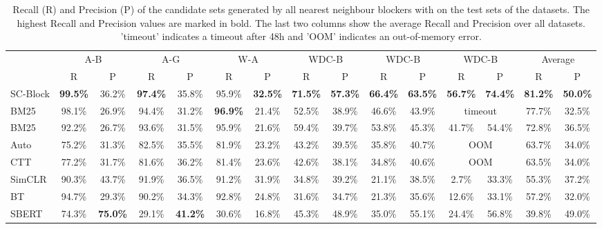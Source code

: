 \documentclass[sigconf,nonacm]{acmart}
\begin{document}
\begin{table*}[]
\caption{Recall (R) and Precision (P) of the candidate sets generated by all nearest neighbour blockers with  on the test sets of the datasets. The highest Recall and Precision values are marked in bold. The last two columns show the average Recall and Precision over all datasets. 'timeout' indicates a timeout after 48h and 'OOM' indicates an out-of-memory error.}
\label{tab:nns_fixed_k}
\begin{tabular}{@{}l|cc|cc|cc|cc|cc|cc|cc@{}}
\toprule
  &  \multicolumn{2}{c}{A-B}  &  \multicolumn{2}{c}{A-G}  &  \multicolumn{2}{c}{W-A}  &  \multicolumn{2}{c}{WDC-B}  & \multicolumn{2}{c}{WDC-B}  & \multicolumn{2}{c}{WDC-B}  &   \multicolumn{2}{c}{Average}\\ 
              &  R      &  P     &  R      &  P     &  R      &  P      &  R      &  P      &  R  &   P &  R  &   P &  R  &   P \\ \midrule
SC-Block & \textbf{99.5\%} & 36.2\% & \textbf{97.4\%} & 35.8\% & 95.9\% & \textbf{32.5\%} & \textbf{71.5\%} & \textbf{57.3\%} & \textbf{66.4\%} & \textbf{63.5\%} & \textbf{56.7\%} & \textbf{74.4\%} & \textbf{81.2\%} & \textbf{50.0\%} \\
BM25  & 98.1\% & 26.9\% & 94.4\% & 31.2\% & \textbf{96.9\%} & 21.4\% & 52.5\% & 38.9\% & 46.6\% & 43.9\% & \multicolumn{2}{c|}{timeout}   & 77.7\% & 32.5\% \\
BM25     & 92.2\% & 26.7\% & 93.6\% & 31.5\% & 95.9\% & 21.6\% & 59.4\% & 39.7\% & 53.8\% & 45.3\% & 41.7\%               & 54.4\%                  & 72.8\% & 36.5\% \\
Auto     & 75.2\% & 31.3\% & 82.5\% & 35.5\% & 81.9\% & 23.2\% & 43.2\% & 39.5\% & 35.8\% & 40.7\% & \multicolumn{2}{c|}{OOM} & 63.7\% & 34.0\% \\
CTT      & 77.2\% & 31.7\% & 81.6\% & 36.2\% & 81.4\% & 23.6\% & 42.6\% & 38.1\% & 34.8\% & 40.6\% & \multicolumn{2}{c|}{OOM} & 63.5\% & 34.0\% \\
SimCLR   & 90.3\% & 43.7\% & 91.9\% & 36.5\% & 91.2\% & 31.9\% & 34.8\% & 39.2\% & 21.1\% & 38.5\% & 2.7\%                & 33.3\%                  & 55.3\% & 37.2\% \\
BT       & 94.7\% & 29.3\% & 90.2\% & 34.3\% & 92.8\% & 24.8\% & 31.6\% & 34.7\% & 21.3\% & 35.6\% & 12.6\%               & 33.1\%                  & 57.2\% & 32.0\% \\
SBERT    & 74.3\% & \textbf{75.0\%} & 29.1\% & \textbf{41.2\%} & 30.6\% & 16.8\% & 45.3\% & 48.9\% & 35.0\% & 55.1\% & 24.4\%               & 56.8\%                  & 39.8\% & 49.0\% \\ 
\bottomrule
\end{tabular}
\end{table*}
\end{document}
